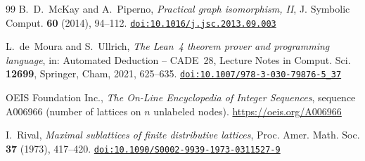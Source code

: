 \documentclass[11pt]{amsart}
\theoremstyle{definition}
\theoremstyle{remark}
\numberwithin{equation}{section}
\newcommand{\doi}[1]{\href{https://doi.org/#1}{\nolinkurl{doi:#1}}}
\begin{document}
\begin{thebibliography}{99}
B.~D.~McKay and A.~Piperno, \emph{Practical graph isomorphism, II}, J. Symbolic Comput. \textbf{60} (2014), 94--112. \doi{10.1016/j.jsc.2013.09.003}

L.~de~Moura and S.~Ullrich, \emph{The Lean~4 theorem prover and programming language}, in: Automated Deduction -- CADE~28, Lecture Notes in Comput. Sci. \textbf{12699}, Springer, Cham, 2021, 625--635. \doi{10.1007/978-3-030-79876-5_37}

OEIS Foundation Inc., \emph{The On-Line Encyclopedia of Integer Sequences}, sequence A006966 (number of lattices on $n$ unlabeled nodes). \url{https://oeis.org/A006966}

I.~Rival, \emph{Maximal sublattices of finite distributive lattices}, Proc. Amer. Math. Soc. \textbf{37} (1973), 417--420. \doi{10.1090/S0002-9939-1973-0311527-9}

\end{thebibliography}
\end{document}
